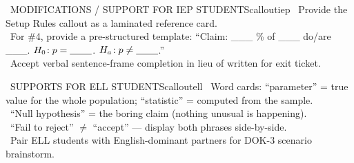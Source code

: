 \documentclass[11pt]{article}
\begin{document}
\begin{callout}{\IconPuzzle\ MODIFICATIONS / SUPPORT FOR IEP STUDENTS}{calloutiep}
\textbullet\ Provide the Setup Rules callout as a laminated reference card.\\
\textbullet\ For \#4, provide a pre-structured template: ``Claim: \_\_\_ \% of \_\_\_ do/are \_\_\_. \(H_0\!: p = \underline{\hspace{0.8cm}}\). \(H_a\!: p \neq \underline{\hspace{0.8cm}}\).''\\
\textbullet\ Accept verbal sentence-frame completion in lieu of written for exit ticket.
\end{callout}

\begin{callout}{\IconGlobe\ SUPPORTS FOR ELL STUDENTS}{calloutell}
\textbullet\ Word cards: ``parameter'' = true value for the whole population; ``statistic'' = computed from the sample.\\
\textbullet\ ``Null hypothesis'' = the boring claim (nothing unusual is happening).\\
\textbullet\ ``Fail to reject'' \(\neq\) ``accept'' --- display both phrases side-by-side.\\
\textbullet\ Pair ELL students with English-dominant partners for DOK-3 scenario brainstorm.
\end{callout}
\end{document}
